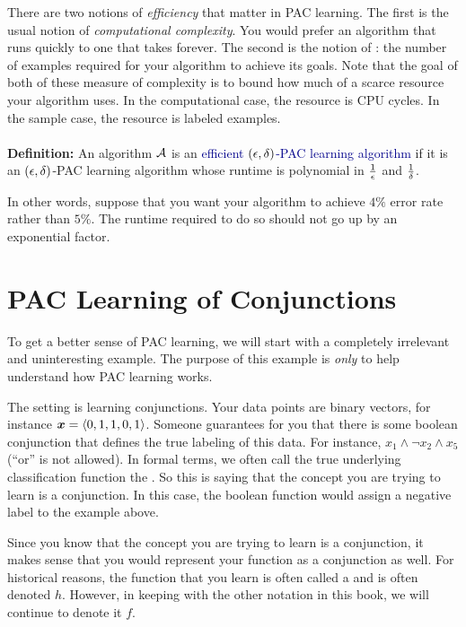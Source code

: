 There are two notions of \emph{efficiency} that matter in PAC
learning.  The first is the usual notion of \emph{computational
  complexity}.  You would prefer an algorithm that runs quickly to one
that takes forever.  The second is the notion of : the number of examples required for your algorithm to
achieve its goals.  Note that the goal of both of these measure of
complexity is to bound how much of a scarce resource your algorithm
uses.  In the computational case, the resource is CPU cycles.  In the
sample case, the resource is labeled examples.
\\
~\\
\noindent
{\bf Definition:} An algorithm $\mathcal{A}$ is an
\textcolor{darkblue}{efficient $(\epsilon,\delta)$-PAC learning algorithm} if
it is an $(\epsilon,\delta)$-PAC learning algorithm whose runtime is
polynomial in $\frac 1 {\epsilon}$ and $\frac 1 {\delta}$.

In other words, suppose that you want your algorithm to achieve $4\%$
error rate rather than $5\%$.  The runtime required to do so should not
go up by an exponential factor.

\section{PAC Learning of Conjunctions}

To get a better sense of PAC learning, we will start with a completely
irrelevant and uninteresting example.  The purpose of this example is
\emph{only} to help understand how PAC learning works.

The setting is learning conjunctions.  Your data points are binary
vectors, for instance ${\boldsymbol{x}} = \langle 0,1,1,0,1 \rangle$.  Someone
guarantees for you that there is some boolean conjunction that defines
the true labeling of this data.  For instance, $x_1 \land \lnot x_2
\land x_5$ (``or'' is not allowed).  In formal terms, we often call
the true underlying classification function the .  So
this is saying that the concept you are trying to learn is a
conjunction.  In this case, the boolean function would assign a
negative label to the example above.

Since you know that the concept you are trying to learn is a
conjunction, it makes sense that you would represent your function as
a conjunction as well.  For historical reasons, the function that you
learn is often called a  and is often denoted $h$.
However, in keeping with the other notation in this book, we will
continue to denote it $f$.

